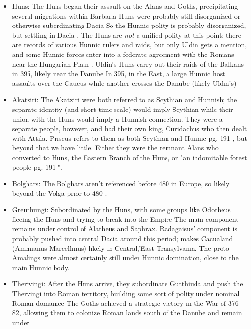 \documentclass{article}
\newcommand{\specificCite}[1]{\tiny #1 \normalsize}
\begin{document}
	\begin{itemize}
		\item Huns:\newline
		The Huns began their assault on the Alans and Goths, precipitating several migrations within Barbaria
		Huns were probably still disorganized or otherwise subordinating Dacia
		So the Hunnic polity is probably disorganized, but settling in Dacia \cite{OttoHuns}.
		The Huns are \textit{not} a unified polity at this point; there are records of various Hunnic rulers and raids, but only Uldin gets a mention, and some Hunnic forces enter into a federate agreement with the Romans near the Hungarian Plain \cite{OttoHuns}.
		Uldin's Huns carry out their raids of the Balkans in 395, likely near the Danube
		In 395, in the East, a large Hunnic host assaults over the Caucus while another crosses the Danube (likely Uldin's)
		
		\item Akatziri:\newline
		The Akatziri were both referred to as Scythian and Hunnish; the separate identity (and short time scale) would imply Scythian while their union with the Huns would imply a Hunnish connection.
		They were a separate people, however, and had their own king, Curidachus \cite{PLRE_Vol2} who then dealt with Attila. 
		Priscus refers to them as both Scythian and Hunnic \cite{CambridgeHistoryEarlyInnerAsia}\specificCite{pg. 191}, but beyond that we have little.
		Either they were the remnant Alans who converted to Huns, the Eastern Branch of the Huns, or "an indomitable forest people \cite{CambridgeHistoryEarlyInnerAsia}\specificCite{pg. 191}".
		
		\item Bolghars:\newline
		The Bolghars aren't referenced before 480 in Europe, so likely beyond the Volga prior to 480 \cite{KimHuns}.
		
		\item Greuthungi:\newline
		Subordinated by the Huns, with some groups like Odotheus fleeing the Huns and trying to break into the Empire
		The main component remains under control of Alatheus and Saphrax.
		Radagaisus' component is probably pushed into central Dacia around this period; makes Cacualand (Ammianus Marcellinus) likely in Central/East Transylvania.
		The proto-Amalings were almost certainly still under Hunnic domination, close to the main Hunnic body.
		
		\item Therivingi:\newline
		After the Huns arrive, they subordinate Gutthiuda and push the Thervingi into Roman territory, building some sort of polity under nominal Roman domaince
		The Goths achieved a strategic victory in the War of 376-82, allowing them to colonize Roman lands south of the Danube and remain under \cite{HeatherEmpiresAndBarbarians}\newline
		

\end{itemize}
\end{document}

